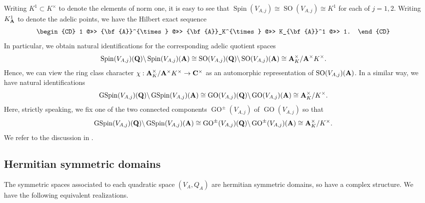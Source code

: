 \documentclass{amsart}
\theoremstyle{definition}
\begin{document}
Writing $K^1 \subset K^{\times}$ to denote the elements of norm one, it is easy to see that 
$\operatorname{Spin}(V_{A, j}) \cong \operatorname{SO}(V_{A, j}) \cong K^1$ for each of $j=1,2$.
Writing $K_{ {\bf{A}} }^1$ to denote the adelic points, we have the Hilbert exact sequence 
\begin{align*}\begin{CD} 1 @>>> {\bf{A}}^{\times} @>>> {\bf{A}}_K^{\times} @>>> K_{\bf{A}}^1 @>>> 1. \end{CD} \end{align*}
In particular, we obtain natural identifications for the corresponding adelic quotient spaces
\begin{align*} \operatorname{Spin}(V_{A, j})({\bf{Q}}) \backslash \operatorname{Spin}(V_{A, j})({\bf{A}}) \cong 
\operatorname{SO}(V_{A, j})({\bf{Q}}) \backslash \operatorname{SO}(V_{A, j})({\bf{A}}) \cong {\bf{A}}_K^{\times}/ {\bf{A}}^{\times} K^{\times}. \end{align*} 
Hence, we can view the ring class character $\chi: {\bf{A}}_K^{\times}/ {\bf{A}}^{\times} K^{\times} \rightarrow {\bf{C}}^{\times}$ as an automorphic
representation of $\operatorname{SO}(V_{A, j})({\bf{A}})$. In a similar way, we have natural identifications 
\begin{align*} \operatorname{GSpin}(V_{A, j})({\bf{Q}}) \backslash \operatorname{GSpin}(V_{A, j})({\bf{A}}) \cong 
\operatorname{GO}(V_{A, j})({\bf{Q}})\backslash \operatorname{GO}(V_{A, j})({\bf{A}}) \cong {\bf{A}}_K^{\times}/K^{\times}. \end{align*} 
Here, strictly speaking, we fix one of the two connected components $\operatorname{GO}^{\pm}(V_{A, j})$ of $\operatorname{GO}(V_{A,j})$ so that
\begin{align*}\operatorname{GSpin}(V_{A, j})({\bf{Q}}) \backslash \operatorname{GSpin}(V_{A, j})({\bf{A}}) \cong 
\operatorname{GO}^{\pm}(V_{A, j})({\bf{Q}}) \backslash \operatorname{GO}^{\pm}(V_{A, j})({\bf{A}}) \cong {\bf{A}}_K^{\times}/K^{\times}. \end{align*} 
We refer to the discussion in \cite[Theorem 2.3.3]{Po}.
 
\subsection{Hermitian symmetric domains}

The symmetric spaces associated to each quadratic space $(V_A, Q_A)$ are hermitian symmetric domains, so have a complex structure. We have the following equivalent realizations. 
    
\end{document}
